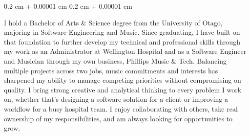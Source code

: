 \documentclass[10pt, letterpaper]{article}
\newenvironment{highlightsforbulletentries}{
    \begin{itemize}[
        topsep=0.10 cm,
        parsep=0.10 cm,
        partopsep=0pt,
        itemsep=0pt,
        leftmargin=10pt
    ]
}{
    \end{itemize}
} %
\newenvironment{onecolentry}{
    \begin{adjustwidth}{
        0.2 cm + 0.00001 cm
    }{
        0.2 cm + 0.00001 cm
    }
}{
    \end{adjustwidth}
} %
\begin{document}
        
        \begin{onecolentry}
        
        
     I hold a Bachelor of Arts \& Science degree from the University of Otago, majoring in Software Engineering and Music. Since graduating, I have built on that foundation to further develop my technical and professional skills through my work as an Administrator at Wellington Hospital and as a Software Engineer and Musician through my own business, Phillips Music \& Tech. Balancing multiple projects across two jobs, music commitments and interests has sharpened my ability to manage competing priorities without compromising on quality. I bring strong creative and analytical thinking to every problem I work on, whether that's designing a software solution for a client or improving a workflow for a busy hospital team. I enjoy collaborating with others, take real ownership of my responsibilities, and am always looking for opportunities to grow.       


        \end{onecolentry}

        \vspace{0.2 cm}


    

\end{document}

